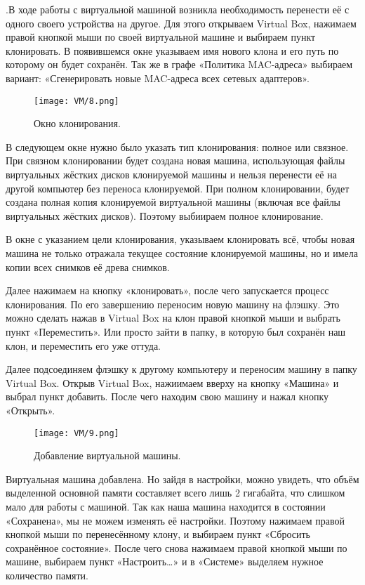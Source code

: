 .\quad В ходе работы с виртуальной машиной возникла необходимость перенести её с одного своего устройства на другое.
\newline Для этого открываем Virtual Box, нажимаем правой кнопкой мыши по своей виртуальной машине и выбираем пункт клонировать. В появившемся окне указываем имя нового клона и его путь по которому он будет сохранён. Так же в графе «Политика MAC-адреса» выбираем вариант: «Сгенерировать новые MAC-адреса всех сетевых адаптеров».

\begin{figure}[h]		
		\centering
		\texttt{[image: VM/8.png]}
\caption{Окно клонирования.}
\label{ris:image}
\end{figure}

\quad В следующем окне нужно было указать тип клонирования: полное или связное. При связном клонировании будет создана новая машина, использующая файлы виртуальных жёстких дисков клонируемой машины и нельзя перенести её на другой компьютер без переноса клонируемой. При полном клонировании, будет создана полная копия клонируемой виртуальной машины (включая все файлы виртуальных жёстких дисков). Поэтому выбиираем полное клонирование.

\quad В окне с указанием цели клонирования, указываем клонировать всё, чтобы новая машина не только отражала текущее состояние клонируемой машины, но и имела копии всех снимков её древа снимков.

\quad Далее нажимаем на кнопку «клонировать», после чего запускается процесс клонирования. По его завершению переносим новую машину на флэшку. Это можно сделать нажав в Virtual Box на клон правой кнопкой мыши и выбрать пункт «Переместить». Или просто зайти в папку, в которую был сохранён наш клон, и переместить его уже оттуда.

\quad Далее подсоединяем флэшку к другому компьютеру и переносим машину в папку Virtual Box. Открыв Virtual Box, нажиимаем вверху на кнопку «Машина» и выбрал пункт добавить. После чего находим свою машину и нажал кнопку «Открыть».

\begin{figure}[h]
		\centering
		\texttt{[image: VM/9.png]}
\caption{Добавление виртуальной машины.}
\label{ris:image}
\end{figure}

\quad Виртуальная машина добавлена. Но зайдя в настройки, можно увидеть, что объём выделенной основной памяти составляет всего лишь 2 гигабайта, что слишком мало для работы с машиной. Так как наша машина находится в состоянии «Сохранена», мы не можем изменять её настройки. Поэтому нажимаем правой кнопкой мыши по перенесённому клону, и выбираем пункт «Сбросить сохранённое состояние». После чего снова нажимаем правой кнопкой мыши по машине, выбираем пункт «Настроить…» и в «Системе» выделяем нужное количество памяти.


